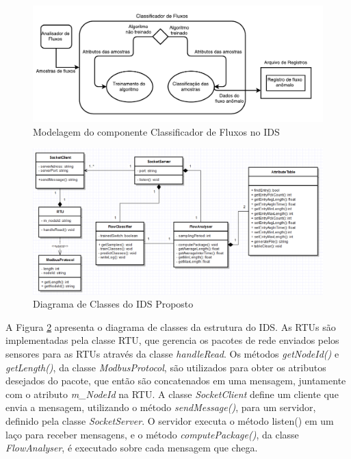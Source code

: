 \documentclass[cic,tc]{iiufrgs}
\begin{document}
\begin{figure}[h]
   \caption{Modelagem do componente Classificador de Fluxos no IDS}
   \begin{center}
       \includegraphics[width=34em]{modelclassifier}
   \end{center}
   \label{modelclassifier}
\end{figure}

\begin{figure}[h]
   \caption{Diagrama de Classes do IDS Proposto}
   \begin{center}
       \includegraphics[width=36em]{classdiagram}
   \end{center}
   \label{classdiagram}
\end{figure}

A Figura \ref{classdiagram} apresenta o diagrama de classes da estrutura do IDS. As RTUs são implementadas pela classe RTU, que gerencia os pacotes de rede enviados pelos sensores para as RTUs através da classe \emph{handleRead}. Os métodos \emph{getNodeId()} e \emph{getLength()}, da classe \emph{ModbusProtocol}, são utilizados para obter os atributos desejados do pacote, que então são concatenados em uma mensagem, juntamente com o atributo \emph{m\_NodeId} na RTU. A classe \emph{SocketClient} define um cliente que envia a mensagem, utilizando o método \emph{sendMessage()}, para um servidor, definido pela classe \emph{SocketServer}. O servidor executa o método listen() em um laço para receber mensagens, e o método \emph{computePackage()}, da classe \emph{FlowAnalyser}, é executado sobre cada mensagem que chega.
\end{document}
